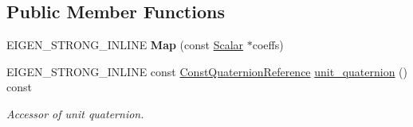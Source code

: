 \subsection*{Public Member Functions}
\begin{DoxyCompactItemize}
\item 
E\+I\+G\+E\+N\+\_\+\+S\+T\+R\+O\+N\+G\+\_\+\+I\+N\+L\+I\+NE {\bfseries Map} (const \hyperlink{class_eigen_1_1_map_3_01const_01_sophus_1_1_s_o3_group_3_01___scalar_01_4_00_01___options_01_4_ab140bd002784cc47ef5472ddc8932d9d}{Scalar} $\ast$coeffs)\hypertarget{class_eigen_1_1_map_3_01const_01_sophus_1_1_s_o3_group_3_01___scalar_01_4_00_01___options_01_4_abf676f1c2ceed3d55429a323a3870eb2}{}\label{class_eigen_1_1_map_3_01const_01_sophus_1_1_s_o3_group_3_01___scalar_01_4_00_01___options_01_4_abf676f1c2ceed3d55429a323a3870eb2}

\item 
E\+I\+G\+E\+N\+\_\+\+S\+T\+R\+O\+N\+G\+\_\+\+I\+N\+L\+I\+NE const \hyperlink{class_eigen_1_1_map_3_01const_01_sophus_1_1_s_o3_group_3_01___scalar_01_4_00_01___options_01_4_af1bc918543cb6466e63a8e6ba82b5d20}{Const\+Quaternion\+Reference} \hyperlink{class_eigen_1_1_map_3_01const_01_sophus_1_1_s_o3_group_3_01___scalar_01_4_00_01___options_01_4_aad2d9300025120be8f92b75cd800d6f6}{unit\+\_\+quaternion} () const 
\begin{DoxyCompactList}\small\item\em Accessor of unit quaternion. \end{DoxyCompactList}\end{DoxyCompactItemize}
